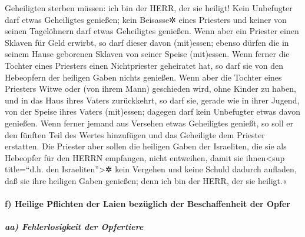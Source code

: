 Geheiligten sterben müssen: ich bin der HERR, der sie heiligt!
Kein Unbefugter darf etwas Geheiligtes genießen; kein
Beisasse✲ eines Priesters und keiner von seinen Tagelöhnern darf etwas
Geheiligtes genießen. Wenn aber ein Priester einen
Sklaven für Geld erwirbt, so darf dieser davon (mit)essen; ebenso dürfen
die in seinem Hause geborenen Sklaven von seiner Speise (mit)essen.
Wenn ferner die Tochter eines Priesters einen
Nichtpriester geheiratet hat, so darf sie von den Hebeopfern der
heiligen Gaben nichts genießen. Wenn aber die Tochter
eines Priesters Witwe oder (von ihrem Mann) geschieden wird, ohne Kinder
zu haben, und in das Haus ihres Vaters zurückkehrt, so darf sie, gerade
wie in ihrer Jugend, von der Speise ihres Vaters (mit)essen; dagegen
darf kein Unbefugter etwas davon genießen. Wenn ferner
jemand aus Versehen etwas Geheiligtes genießt, so soll er den fünften
Teil des Wertes hinzufügen und das Geheiligte dem Priester erstatten.
Die Priester aber sollen die heiligen Gaben der
Israeliten, die sie als Hebeopfer für den HERRN empfangen, nicht
entweihen, damit sie ihnen\textless sup title=``d.h. den
Israeliten''\textgreater✲ kein Vergehen und keine Schuld dadurch
aufladen, daß sie ihre heiligen Gaben genießen; denn ich bin der HERR,
der sie heiligt.«

\hypertarget{f-heilige-pflichten-der-laien-bezuxfcglich-der-beschaffenheit-der-opfer}{%
\paragraph{f) Heilige Pflichten der Laien bezüglich der Beschaffenheit
der
Opfer}\label{f-heilige-pflichten-der-laien-bezuxfcglich-der-beschaffenheit-der-opfer}}

\hypertarget{aa-fehlerlosigkeit-der-opfertiere}{%
\subparagraph{aa) Fehlerlosigkeit der
Opfertiere}\label{aa-fehlerlosigkeit-der-opfertiere}}

